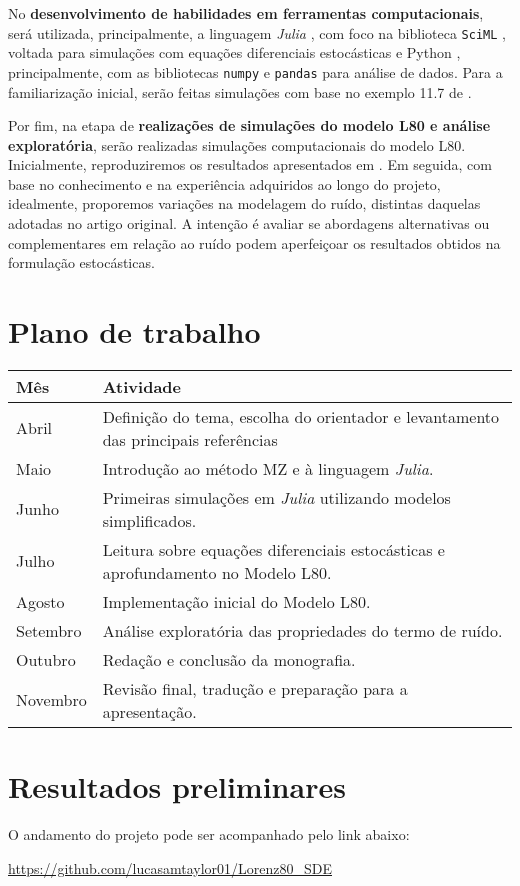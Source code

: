 \documentclass[12pt]{article}
\begin{document}
No \textbf{desenvolvimento de habilidades em ferramentas computacionais}, será utilizada, principalmente, a linguagem \textit{Julia} \citep{julialang}, com foco na biblioteca \texttt{SciML} \citep{SDEJulia}, voltada para simulações com equações diferenciais estocásticas e Python \citep{Python}, principalmente, com as bibliotecas \texttt{numpy} \citep{numpy} e \texttt{pandas} \citep{pandas} para análise de dados. Para a familiarização inicial, serão feitas simulações com base no exemplo 11.7 de \citep[p.~169]{Pavliotis2008}.

Por fim, na etapa de \textbf{realizações de simulações do modelo L80 e análise exploratória}, serão realizadas simulações computacionais do modelo L80. Inicialmente, reproduziremos os resultados apresentados em \citet{Chekroun2021}. Em seguida, com base no conhecimento e na experiência adquiridos ao longo do projeto, idealmente, proporemos variações na modelagem do ruído, distintas daquelas adotadas no artigo original. A intenção é avaliar se abordagens alternativas ou complementares em relação ao ruído podem aperfeiçoar os resultados obtidos na formulação estocásticas.

\section*{Plano de trabalho}
\begin{center}
	\renewcommand{\arraystretch}{1.5}
	\begin{tabular}{p{3cm}p{10cm}}
		\toprule
		\textbf{Mês} & \textbf{Atividade}\\
		\midrule
		Abril         & Definição do tema, escolha do orientador e levantamento das principais referências\\
		Maio          & Introdução ao método MZ e à linguagem \textit{Julia}.\\
		Junho         & Primeiras simulações em \textit{Julia} utilizando modelos simplificados.\\
		Julho         & Leitura sobre equações diferenciais estocásticas e aprofundamento no Modelo L80.\\
		Agosto        & Implementação inicial do Modelo L80.\\
		Setembro      & Análise exploratória das propriedades do termo de ruído.\\
		Outubro       & Redação e conclusão da monografia.\\
		Novembro      & Revisão final, tradução e preparação para a apresentação.\\
		\bottomrule
	\end{tabular}
\end{center}

\section*{Resultados preliminares}
O andamento do projeto pode ser acompanhado pelo link abaixo:

\url{https://github.com/lucasamtaylor01/Lorenz80_SDE}

\newpage
\nocite{*}
\printbibliography[title={Referências}, label={sec:bib}]
\end{document}
